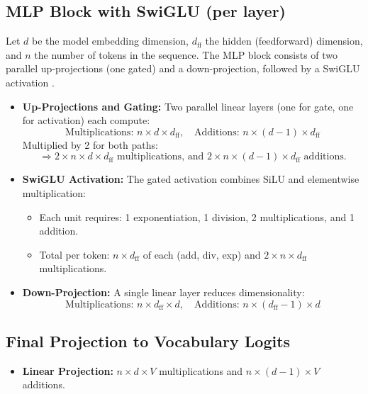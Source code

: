 \documentclass[a4paper,12pt]{article}
\begin{document}
\subsection*{MLP Block with SwiGLU (per layer)}

Let $d$ be the model embedding dimension, $d_{\text{ff}}$ the hidden (feedforward) dimension, and $n$ the number of tokens in the sequence. The MLP block consists of two parallel up-projections (one gated) and a down-projection, followed by a SwiGLU activation \citep{shazeer2020glu}.

\begin{itemize}
  \item \textbf{Up-Projections and Gating:} Two parallel linear layers (one for gate, one for activation) each compute:
  \[
  \text{Multiplications: } n \times d \times d_{\text{ff}}, \quad
  \text{Additions: } n \times (d - 1) \times d_{\text{ff}}
  \]
  Multiplied by 2 for both paths:
  \[
  \Rightarrow 2 \times n \times d \times d_{\text{ff}} \text{ multiplications, and } 2 \times n \times (d - 1) \times d_{\text{ff}} \text{ additions.}
  \]

  \item \textbf{SwiGLU Activation:} The gated activation combines SiLU and elementwise multiplication:
  \begin{itemize}
    \item Each unit requires: 1 exponentiation, 1 division, 2 multiplications, and 1 addition.
    \item Total per token: $n \times d_{\text{ff}}$ of each (add, div, exp) and $2 \times n \times d_{\text{ff}}$ multiplications.
  \end{itemize}

  \item \textbf{Down-Projection:} A single linear layer reduces dimensionality:
  \[
  \text{Multiplications: } n \times d_{\text{ff}} \times d, \quad
  \text{Additions: } n \times (d_{\text{ff}} - 1) \times d
  \]
\end{itemize}


\subsection*{Final Projection to Vocabulary Logits}
\begin{itemize}
  \item \textbf{Linear Projection:} $n \times d \times V$ multiplications and $n \times (d - 1) \times V$ additions.
\end{itemize}
\end{document}
